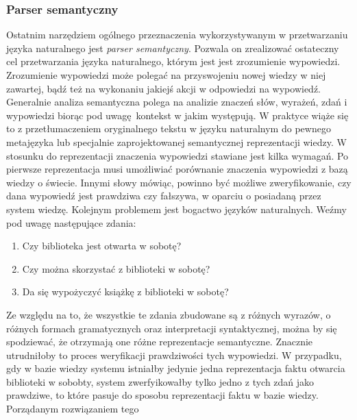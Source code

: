 \documentclass[a4paper, twoside, 12pt]{report}
\begin{document}
            \subsubsection{Parser semantyczny}
                Ostatnim narzędziem ogólnego przeznaczenia wykorzystywanym w przetwarzaniu języka naturalnego jest
                \emph{parser semantyczny}. Pozwala on zrealizować ostateczny cel przetwarzania języka naturalnego, którym
                jest jest zrozumienie wypowiedzi. Zrozumienie wypowiedzi może polegać na przyswojeniu nowej wiedzy w niej
                zawartej, bądź też na wykonaniu jakiejś akcji w odpowiedzi na wypowiedź. Generalnie analiza semantyczna
                polega na analizie znaczeń słów, wyrażeń, zdań i wypowiedzi biorąc pod uwagę kontekst w jakim występują.
                W praktyce wiąże się to z przetłumaczeniem oryginalnego tekstu w języku naturalnym do pewnego metajęzyka
                lub specjalnie zaprojektowanej semantycznej reprezentacji wiedzy. W stosunku do reprezentacji znaczenia
                wypowiedzi stawiane jest kilka wymagań. Po pierwsze reprezentacja musi umożliwiać porównanie znaczenia wypowiedzi
                z bazą wiedzy o świecie. Innymi słowy mówiąc, powinno być możliwe zweryfikowanie, czy dana wypowiedź jest
                prawdziwa czy fałszywa, w oparciu o posiadaną przez system wiedzę. Kolejnym problemem jest bogactwo języków
                naturalnych. Weźmy pod uwagę następujące zdania:
                \begin{enumerate}
                    \item Czy biblioteka jest otwarta w sobotę?
                    \item Czy można skorzystać z biblioteki w sobotę?
                    \item Da się wypożyczyć książkę z biblioteki w sobotę?
                \end{enumerate}
                Ze względu na to, że wszystkie te zdania zbudowane są z różnych wyrazów, o różnych formach gramatycznych oraz
                interpretacji syntaktycznej, można by się spodziewać, że otrzymają one różne reprezentacje semantyczne. Znacznie
                utrudniłoby to proces weryfikacji prawdziwości tych wypowiedzi. W przypadku, gdy w bazie wiedzy systemu istniałby
                jedynie jedna reprezentacja faktu otwarcia biblioteki w sobobty, system zwerfyikowałby tylko jedno z tych zdań
                jako prawdziwe, to które pasuje do sposobu reprezentacji faktu w bazie wiedzy. Porządanym rozwiązaniem tego
\end{document}

